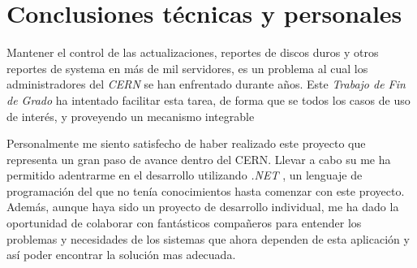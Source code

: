 \section{Conclusiones técnicas y personales}

    Mantener el control de las actualizaciones, reportes de discos duros y otros reportes de systema en más de mil servidores, es un problema al cual los administradores del \textit{CERN} se han enfrentado durante años. Este \textit{Trabajo de Fin de Grado} ha intentado facilitar esta tarea, de forma que se  todos los casos de uso de interés, y proveyendo un mecanismo integrable 
    
    
    
    Personalmente me siento satisfecho de haber realizado este proyecto que representa un gran paso de avance dentro del CERN. Llevar a cabo su  me ha permitido adentrarme en el desarrollo utilizando \textit{.NET} , un lenguaje de programación del que no tenía conocimientos hasta comenzar con este proyecto. Además, aunque haya sido un proyecto de desarrollo individual, me ha dado la oportunidad de colaborar con fantásticos compañeros para entender los problemas y necesidades de los sistemas que ahora dependen de esta aplicación y así poder encontrar la solución mas adecuada.



